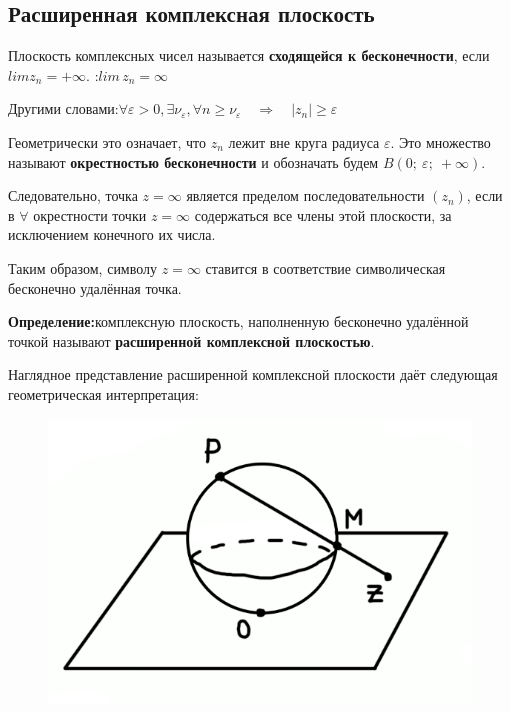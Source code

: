 \documentclass[a4paper, 12pt]{report}
\begin{document}
 
 \subsection{Расширенная комплексная плоскость}  
 
 Плоскость комплексных чисел называется \textbf{сходящейся к бесконечности}, если $lim z_n=+\infty$. :\quad $lim\, z_n=\infty$
 
 Другими словами:\quad $\forall\varepsilon>0, \exists\nu_\varepsilon, \forall n\geqslant\nu_\varepsilon\quad\Rightarrow\quad|z_n|\geqslant\varepsilon$
 
 Геометрически это означает, что $z_n$ лежит вне круга радиуса $\varepsilon$. Это множество называют \textbf{окрестностью бесконечности} и обозначать будем $B(0;\ \varepsilon;\ +\infty)$.
 
 Следовательно, точка $z=\infty$ является пределом последовательности $(z_n)$, если в $\forall$ окрестности точки $z=\infty$ содержаться все члены этой плоскости, за исключением конечного их числа.
 
 Таким образом, символу $z=\infty$ ставится в соответствие символическая бесконечно удалённая точка.
 
 \par\bigskip
 \textbf{Определение:}\quad комплексную плоскость, наполненную бесконечно удалённой точкой называют \textbf{расширенной комплексной плоскостью}.
 \par\bigskip
 \newpage
 Наглядное представление расширенной комплексной плоскости даёт следующая геометрическая интерпретация:
 \begin{figure} 
    \vspace{-2ex}
    \includegraphics[width=0.9\linewidth]{kompl/4kompl.png}
\end{figure}
 
\end{document}
